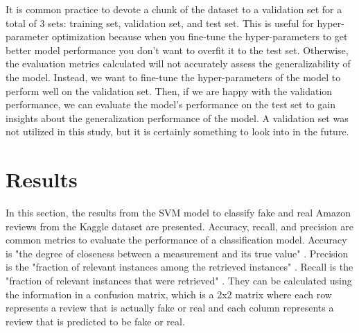 \documentclass[12pt]{article}
\begin{document}
\bigskip

It is common practice to devote a chunk of the dataset to a validation set for a total of 3 sets: training set, validation set, and test set. This is useful for hyper-parameter optimization because when you fine-tune the hyper-parameters to get better model performance you don't want to overfit it to the test set. Otherwise, the evaluation metrics calculated will not accurately assess the generalizability of the model. Instead, we want to fine-tune the hyper-parameters of the model to perform well on the validation set. Then, if we are happy with the validation performance, we can evaluate the model's performance on the test set to gain insights about the generalization performance of the model. A validation set was not utilized in this study, but it is certainly something to look into in the future.

\section{Results}
\label{sec:results}

In this section, the results from the SVM model to classify fake and real Amazon reviews from the Kaggle dataset are presented. Accuracy, recall, and precision are common metrics to evaluate the performance of a classification model. Accuracy is "the degree of closeness between a measurement and its true value" \citep{admin_2022}. Precision is the "fraction of relevant instances among the retrieved instances" \citep{wikipedia_2022}. Recall is the "fraction of relevant instances that were retrieved" \citep{wikipedia_2022}. They can be calculated using the information in a confusion matrix, which is a 2x2 matrix where each row represents a review that is actually fake or real and each column represents a review that is predicted to be fake or real.

\bigskip
\bigskip

\end{document}
